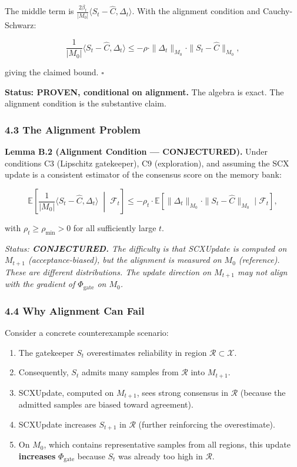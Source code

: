 \documentclass[
  12pt,
]{ctexart}
\providecommand{\tightlist}{%
  \setlength{\itemsep}{0pt}\setlength{\parskip}{0pt}}
\begin{document}
The middle term is
\(\frac{2\beta_t}{|M_0|} \langle S_t - \hat{C}, \Delta_t \rangle\). With
the alignment condition and Cauchy-Schwarz:

\[\frac{1}{|M_0|}\langle S_t - \hat{C}, \Delta_t \rangle \leq -\rho \cdot \|\Delta_t\|_{M_0} \cdot \|S_t - \hat{C}\|_{M_0},\]

giving the claimed bound. \(\square\)

\textbf{Status: PROVEN, conditional on alignment.} The algebra is exact.
The alignment condition is the substantive claim.

\subsubsection{4.3 The Alignment Problem}\label{the-alignment-problem}

\textbf{Lemma B.2 (Alignment Condition --- CONJECTURED).} Under
conditions C3 (Lipschitz gatekeeper), C9 (exploration), and assuming the
SCX update is a consistent estimator of the consensus score on the
memory bank:

\[\mathbb{E}\left[\frac{1}{|M_0|}\langle S_t - \hat{C}, \Delta_t \rangle \;\middle|\; \mathcal{F}_t\right] \leq -\rho_t \cdot \mathbb{E}[\|\Delta_t\|_{M_0} \cdot \|S_t - \hat{C}\|_{M_0} \mid \mathcal{F}_t],\]

with \(\rho_t \geq \rho_{\min} > 0\) for all sufficiently large \(t\).

\emph{Status: \textbf{CONJECTURED.} The difficulty is that SCXUpdate is
computed on \(M_{t+1}\) (acceptance-biased), but the alignment is
measured on \(M_0\) (reference). These are different distributions. The
update direction on \(M_{t+1}\) may not align with the gradient of
\(\Phi_{\text{gate}}\) on \(M_0\).}

\subsubsection{4.4 Why Alignment Can Fail}\label{why-alignment-can-fail}

Consider a concrete counterexample scenario:

\begin{enumerate}
\def\labelenumi{\arabic{enumi}.}
\tightlist
\item
  The gatekeeper \(S_t\) overestimates reliability in region
  \(\mathcal{R} \subset \mathcal{X}\).
\item
  Consequently, \(S_t\) admits many samples from \(\mathcal{R}\) into
  \(M_{t+1}\).
\item
  SCXUpdate, computed on \(M_{t+1}\), sees strong consensus in
  \(\mathcal{R}\) (because the admitted samples are biased toward
  agreement).
\item
  SCXUpdate increases \(S_{t+1}\) in \(\mathcal{R}\) (further
  reinforcing the overestimate).
\item
  On \(M_0\), which contains representative samples from all regions,
  this update \textbf{increases} \(\Phi_{\text{gate}}\) because \(S_t\)
  was already too high in \(\mathcal{R}\).
\end{enumerate}
\end{document}
